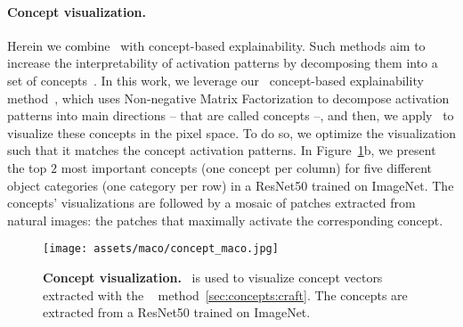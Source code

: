 \paragraph{Concept visualization.} Herein we combine \magfv~with concept-based explainability. Such methods aim to increase the interpretability of activation patterns by decomposing them into a set of concepts~\cite{ghorbani2019towards}. In this work, we leverage our \craft~concept-based explainability method~\cite{fel2023craft}, which uses Non-negative Matrix Factorization to decompose activation patterns into main directions -- that are called concepts --, and then, we apply \magfv~to visualize these concepts in the pixel space. To do so, we optimize the visualization such that it matches the concept activation patterns. In Figure~\ref{fig:maco:concepts}b, we present the top $2$ most important concepts (one concept per column) for five different object categories (one category per row) in a ResNet50 trained on ImageNet. The concepts' visualizations are followed by a mosaic of patches extracted from natural images: the patches that maximally activate the corresponding concept. 

\begin{figure}
    \centering
    \texttt{[image: assets/maco/concept\_maco.jpg]}
    \caption{\textbf{Concept visualization.} \magfv~is used to visualize concept vectors extracted with the \craft~ method~\autoref{sec:concepts:craft}. The concepts are extracted from a ResNet50 trained on ImageNet.}
    \label{fig:maco:concepts}
\end{figure}











